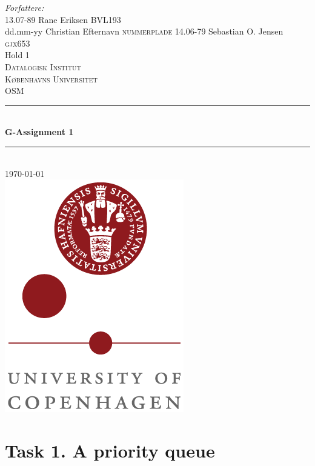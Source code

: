 \documentclass[a4paper,12pt,danish]{report}
\begin{document}
\begin{titlepage}

\newcommand{\HRule}{\rule{\linewidth}{0.4mm}}
\center
\small{ \emph{Forfattere:}\\
13.07-89 Rane Eriksen \textsc{BVL193}
\\
dd.mm-yy Christian Efternavn \textsc{nummerplade}
14.06-79 Sebastian O. Jensen \textsc{gjx653}
\\
Hold 1} \\[2cm]

\textsc{\LARGE Datalogisk Institut}\\[0.5cm]
\textsc{\large Københavns Universitet}\\[1.5cm]
\textsc{\large OSM}\\
\HRule \\[0.7cm]
{\huge \bfseries G-Assignment 1}\\[0.4cm]
\HRule \\[1.5cm]
\textsc{\Large \textsc{\today}}\\[0.5cm]

\includegraphics[scale=0.5]{ku_logo.png}\\[1cm]

\end{titlepage}
\tableofcontents
\newpage
\renewcommand{\thesectiont	}{\arabic{section}}
\renewcommand{\thempfootnote}{\arabic{mpfootnote}}
\renewcommand\thesubsection{}
\newcommand{\minus}[1]{{#1}^{-}}
\section{Task 1. A priority queue}
\end{document}
